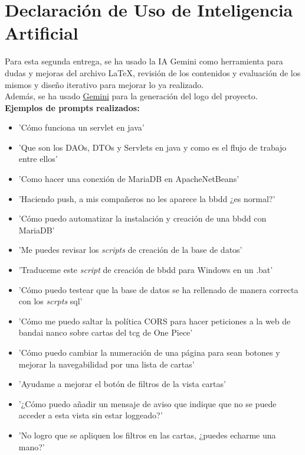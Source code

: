\documentclass[10pt]{article}
\begin{document}
	\section{Declaración de Uso de Inteligencia Artificial}
		Para esta segunda entrega, se ha usado la IA Gemini como herramienta para dudas y mejoras del archivo LaTeX, revisión de los contenidos y evaluación de los mismos y diseño iterativo para mejorar lo ya realizado.\\
		Además, se ha usado \href{https://gemini.google.com/share/7a923a0bfae8}{Gemini} para la generación del logo del proyecto.\\
		\textbf{Ejemplos de prompts realizados:}
		\begin{itemize}
			\item 'Cómo funciona un servlet en java'
			\item 'Que son los DAOs, DTOs y Servlets en java y como es el flujo de trabajo entre ellos'
			\item 'Como hacer una conexión de MariaDB en ApacheNetBeans'
			\item 'Haciendo push, a mis compañeros no les aparece la bbdd ¿es normal?'
			\item 'Cómo puedo automatizar la instalación y creación de una bbdd con MariaDB'
			\item 'Me puedes revisar los \textit{scripts} de creación de la base de datos'
			\item 'Traduceme este \textit{script} de creación de bbdd para Windows en un .bat'
			\item 'Cómo puedo testear que la base de datos se ha rellenado de manera correcta con los \textit{scrpts} sql'
			\item 'Cómo me puedo saltar la política CORS para hacer peticiones a la web de bandai nanco sobre cartas del tcg de One Piece'
			\item 'Cómo puedo cambiar la numeración de una página para sean botones y mejorar la navegabilidad por una lista de cartas'
	        \item 'Ayudame a mejorar el botón de filtros de la vista cartas'
	        \item '¿Cómo puedo añadir un mensaje de aviso que indique que no se puede acceder a esta vista sin estar loggeado?'
	        \item 'No logro que se apliquen los filtros en las cartas, ¿puedes echarme una mano?'
		\end{itemize}
	
	
\end{document}

